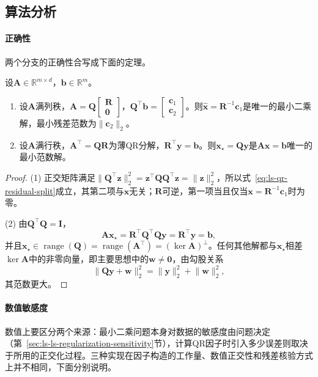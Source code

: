 \subsection{算法分析}

\paragraph{正确性}
两个分支的正确性合写成下面的定理。

\begin{theorem}[QR给出最小二乘解与最小范数解]
\label{thm:ls-qr-least-squares}
设$\bm A\in\mathbb R^{m\times d}$，$\bm b\in\mathbb R^m$。
\begin{enumerate}
 \item 设$\bm A$满列秩，$\bm A=\bm Q\left[\begin{smallmatrix}\bm R\\\bm0\end{smallmatrix}\right]$，$\bm Q^\top\bm b=\left[\begin{smallmatrix}\bm c_1\\\bm c_2\end{smallmatrix}\right]$。则$\hat{\bm x}=\bm R^{-1}\bm c_1$是唯一的最小二乘解，最小残差范数为$\lVert\bm c_2\rVert_2$。
 \item 设$\bm A$满行秩，$\bm A^\top=\bm Q\bm R$为薄QR分解，$\bm R^\top\bm y=\bm b$。则$\bm x_\star=\bm Q\bm y$是$\bm A\bm x=\bm b$唯一的最小范数解。
\end{enumerate}
\end{theorem}
\begin{proof}
(1) 正交矩阵满足$\lVert\bm Q^\top\bm z\rVert_2^2=\bm z^\top\bm Q\bm Q^\top\bm z=\lVert\bm z\rVert_2^2$，所以式~\eqref{eq:ls-qr-residual-split}成立，其第二项与$\bm x$无关；$\bm R$可逆，第一项当且仅当$\bm x=\bm R^{-1}\bm c_1$时为零。

(2) 由$\bm Q^\top\bm Q=\bm I$，
\[
 \bm A\bm x_\star=\bm R^\top\bm Q^\top\bm Q\bm y=\bm R^\top\bm y=\bm b ,
\]
并且$\bm x_\star\in\operatorname{range}(\bm Q)=\operatorname{range}(\bm A^\top)=(\ker\bm A)^\perp$。任何其他解都与$\bm x_\star$相差$\ker\bm A$中的非零向量，即主要思想中的$\bm w\neq\bm0$，由勾股关系
\[
 \lVert\bm Q\bm y+\bm w\rVert_2^2=\lVert\bm y\rVert_2^2+\lVert\bm w\rVert_2^2 ,
\]
其范数更大。
\end{proof}

\paragraph{数值敏感度}
数值上要区分两个来源：最小二乘问题本身对数据的敏感度由问题决定（第~\ref{sec:ls-ls-regularization-sensitivity}节），计算QR因子时引入多少误差则取决于所用的正交化过程。三种实现在因子构造的工作量、数值正交性和残差核验方式上并不相同，下面分别说明。

